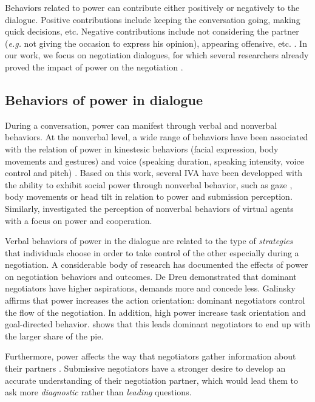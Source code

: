 \documentclass{llncs}
\begin{document}
	Behaviors related to power can contribute either positively or negatively to the dialogue. Positive contributions include keeping the conversation going, making quick decisions, etc. Negative contributions include not considering the partner (\emph{e.g.} not giving the occasion to express his opinion), appearing offensive, etc. \cite{zablotskaya2012relating}. In our work, we focus on negotiation dialogues, for which several researchers already proved the impact of power on the negotiation \cite{van2006power}.
	
	\subsection*{Behaviors of power in dialogue}
	\label{domDialogue}
	During a conversation, power can manifest through verbal and nonverbal behaviors.	
	At the nonverbal level, a wide range of behaviors have been associated with the relation of power in kinestesic behaviors (facial expression, body movements and gestures) and voice (speaking duration, speaking intensity, voice control and pitch) \cite{burgoonnonverbal}. Based on this work, several IVA have been developped with the ability to exhibit social power through nonverbal behavior, such as gaze \cite{lance2008relation}, body movements \cite{mignault2003many} or head tilt \cite{gebhard2014exploring,callejas2014computational} in relation to power and submission perception. Similarly, \cite{strassmann2016effect} investigated the perception of nonverbal behaviors of virtual agents with a focus on power and cooperation.
	
	Verbal behaviors of power in the dialogue are related to the type of \textit{strategies} that individuals choose in order to take control of the other especially during a negotiation. A considerable body of research has documented the effects of power on negotiation behaviors and outcomes. De Dreu demonstrated that \cite{de1995impact} dominant negotiators have higher aspirations, demands more and concede less. Galinsky \cite{galinsky2003power} affirms that power increases the action orientation: dominant negotiators control the flow of the negotiation. In addition, high power increase task orientation and goal-directed behavior. \cite{giebels2000interdependence} shows that this leads dominant negotiators to end up with the larger share of the pie.
	
	Furthermore, power affects the way that negotiators gather information about their partners \cite{de2004influence}. Submissive negotiators have a stronger desire to develop an accurate understanding of their negotiation partner, which would lead them to ask more \emph{diagnostic} rather than \emph{leading} questions.
	
\end{document}

